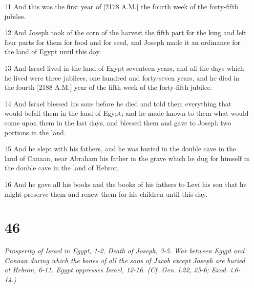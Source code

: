 \par 11 And this was the first year of [2178 A.M.] the fourth week of the forty-fifth jubilee.
\par 12 And Joseph took of the corn of the harvest the fifth part for the king and left four parts for them for food and for seed, and Joseph made it an ordinance for the land of Egypt until this day.
\par 13 And Israel lived in the land of Egypt seventeen years, and all the days which he lived were three jubilees, one hundred and forty-seven years, and he died in the fourth [2188 A.M.] year of the fifth week of the forty-fifth jubilee.
\par 14 And Israel blessed his sons before he died and told them everything that would befall them in the land of Egypt; and he made known to them what would come upon them in the last days, and blessed them and gave to Joseph two portions in the land.
\par 15 And he slept with his fathers, and he was buried in the double cave in the land of Canaan, near Abraham his father in the grave which he dug for himself in the double cave in the land of Hebron.
\par 16 And he gave all his books and the books of his fathers to Levi his son that he might preserve them and renew them for his children until this day.

\chapter{46}

\par \textit{Prosperity of Israel in Egypt, 1-2. Death of Joseph, 3-5. War between Egypt and Canaan during which the bones of all the sons of Jacob except Joseph are buried at Hebron, 6-11. Egypt oppresses Israel, 12-16. (Cf. Gen. l.22, 25-6; Exod. i.6-14.)}

